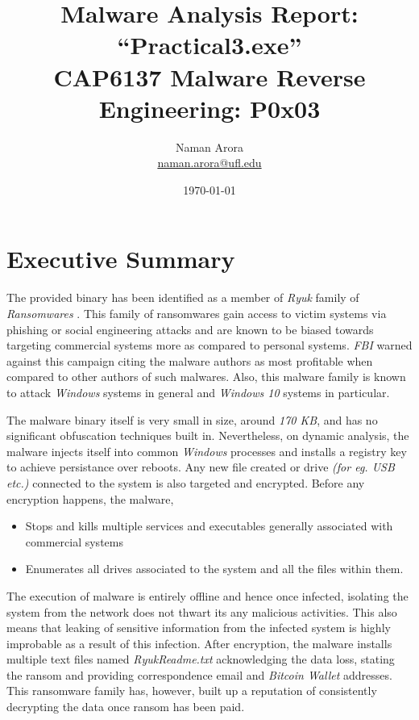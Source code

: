 \documentclass[10pt,a4paper]{article}
\begin{document}

\title{Malware Analysis Report: ``Practical3.exe''\\ \vspace{-8pt} {\large CAP6137 Malware Reverse Engineering: P0x03}}
\author{{Naman Arora \\ \vspace{-10pt}\small \href{mailto:naman.arora@ufl.edu}{naman.arora@ufl.edu}}}
\date{\today}

\maketitle
\newpage
\tableofcontents
\newpage
\section{Executive Summary}
The provided binary has been identified as a member of \textit{Ryuk} family of \textit{Ransomwares} \cite{ransomware}.
This family of ransomwares gain access to victim systems via phishing \cite{phishing} or social engineering attacks \cite{socialEngg} and are known to be biased towards targeting commercial systems more as compared to personal systems.
\textit{FBI} warned against this campaign citing the malware authors as most profitable when compared to other authors of such malwares.
Also, this malware family is known to attack \textit{Windows} systems in general and \textit{Windows 10} systems in particular.

The malware binary itself is very small in size, around \textit{170 KB}, and has no significant obfuscation techniques built in.
Nevertheless, on dynamic analysis, the malware injects itself into common \textit{Windows} processes and installs a registry key to achieve persistance over reboots.
Any new file created or drive \textit{(for eg. USB etc.)} connected to the system is also targeted and encrypted.
Before any encryption happens, the malware,
\begin{itemize}
	\item Stops and kills multiple services and executables generally associated with commercial systems
	\item Enumerates all drives associated to the system and all the files within them.
\end{itemize}

The execution of malware is entirely offline and hence once infected, isolating the system from the network does not thwart its any malicious activities.
This also means that leaking of sensitive information from the infected system is highly improbable as a result of this infection.
After encryption, the malware installs multiple text files named \textit{RyukReadme.txt} acknowledging the data loss, stating the ransom and providing correspondence email and \textit{Bitcoin Wallet} addresses.
This ransomware family has, however, built up a reputation of consistently decrypting the data once ransom has been paid.
\end{document}
